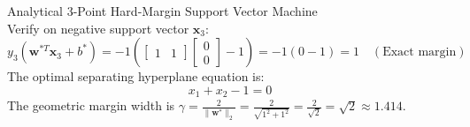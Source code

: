 \begin{examplebox}[breakable]{Analytical 3-Point Hard-Margin Support Vector Machine}
\begin{equation}
\end{equation}
Verify on negative support vector $\mathbf{x}_3$:
\begin{equation}
y_3(\mathbf{w}^{*T} \mathbf{x}_3 + b^*) = -1\left( \begin{bmatrix} 1 & 1 \end{bmatrix} \begin{bmatrix} 0 \\ 0 \end{bmatrix} - 1 \right) = -1(0 - 1) = 1 \quad (\text{Exact margin})
\end{equation}
The optimal separating hyperplane equation is:
\begin{equation}
x_1 + x_2 - 1 = 0
\end{equation}
The geometric margin width is $\gamma = \frac{2}{\|\mathbf{w}^*\|_2} = \frac{2}{\sqrt{1^2 + 1^2}} = \frac{2}{\sqrt{2}} = \sqrt{2} \approx 1.414$.
\end{examplebox}


